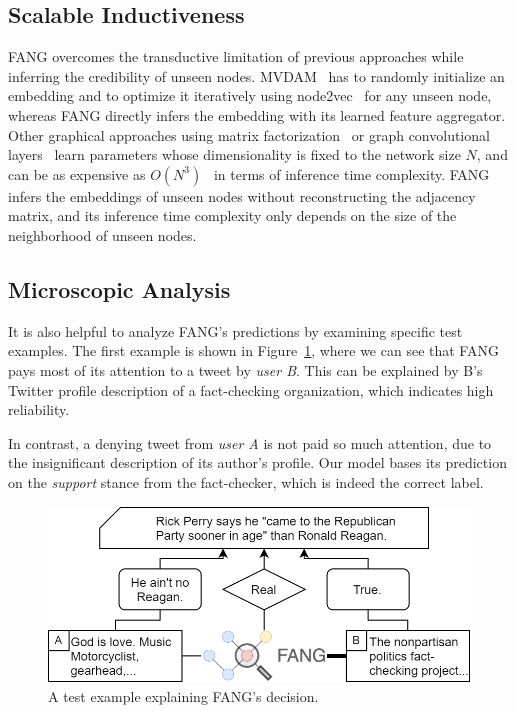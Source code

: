 \documentclass[sigconf]{acmart}
\theoremstyle{definition}
\theoremstyle{hypothesis}
\begin{document}
\subsection{Scalable Inductiveness}
FANG overcomes the transductive limitation of previous approaches while inferring the credibility of unseen nodes. MVDAM~\cite{kulkarni2018multi} has to randomly initialize an embedding and to optimize it iteratively using node2vec~\cite{grover2016node2vec} for any unseen node, whereas FANG directly infers the embedding with its learned feature aggregator. Other graphical approaches using matrix factorization~\cite{shu2019beyond} or graph convolutional layers~\cite{monti2019fake,ming2019multiple} learn parameters whose dimensionality is fixed to the network size $N$, and can be as expensive as $O(N^3)$~\cite{ming2019multiple} in terms of inference time complexity. FANG infers the embeddings of unseen nodes without reconstructing the adjacency matrix, and its inference time complexity only depends on the size of the neighborhood of unseen nodes.

\subsection{Microscopic Analysis}
It is also helpful to analyze FANG's predictions by examining specific test examples.  The first example is shown in Figure~\ref{fig:micro_1},
where we can see that FANG pays most of its attention to a tweet by \textit{user B}. This can be explained by B's Twitter profile description of a fact-checking organization, which indicates high reliability. 

In contrast, a denying tweet from \textit{user A} is not paid so much attention, due to the insignificant description of its author's profile. Our model bases its prediction on the \emph{support} stance from the fact-checker, which is indeed the correct label.

\begin{figure}[t]
\centering
\includegraphics[scale=0.25]{micro1.png}
\caption{A test example explaining FANG's decision.}
\label{fig:micro_1}
\end{figure}
\end{document}

